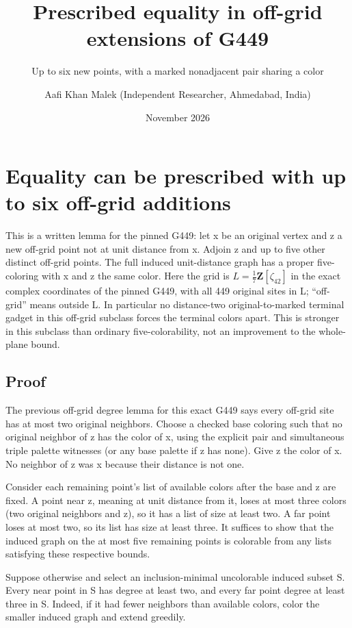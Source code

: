 \documentclass[
  11pt,
]{article}
\title{Prescribed equality in off-grid extensions of G449}
\subtitle{Up to six new points, with a marked nonadjacent pair sharing a
color}
\author{Aafi Khan Malek (Independent Researcher, Ahmedabad, India)}
\date{November 2026}
\begin{document}
\maketitle

\section{Equality can be prescribed with up to six off-grid
additions}\label{equality-can-be-prescribed-with-up-to-six-off-grid-additions}

This is a written lemma for the pinned G449: let x be an original vertex
and z a new off-grid point not at unit distance from x. Adjoin z and up
to five other distinct off-grid points. The full induced unit-distance
graph has a proper five-coloring with x and z the same color. Here the
grid is \(L=\tfrac17\mathbf{Z}[\zeta_{42}]\) in the exact complex
coordinates of the pinned G449, with all 449 original sites in L;
``off-grid'' means outside L. In particular no distance-two
original-to-marked terminal gadget in this off-grid subclass forces the
terminal colors apart. This is stronger in this subclass than ordinary
five-colorability, not an improvement to the whole-plane bound.

\subsection{Proof}\label{proof}

The previous off-grid degree lemma for this exact G449 says every
off-grid site has at most two original neighbors. Choose a checked base
coloring such that no original neighbor of z has the color of x, using
the explicit pair and simultaneous triple palette witnesses (or any base
palette if z has none). Give z the color of x. No neighbor of z was x
because their distance is not one.

Consider each remaining point's list of available colors after the base
and z are fixed. A point near z, meaning at unit distance from it, loses
at most three colors (two original neighbors and z), so it has a list of
size at least two. A far point loses at most two, so its list has size
at least three. It suffices to show that the induced graph on the at
most five remaining points is colorable from any lists satisfying these
respective bounds.

Suppose otherwise and select an inclusion-minimal uncolorable induced
subset S. Every near point in S has degree at least two, and every far
point degree at least three in S. Indeed, if it had fewer neighbors than
available colors, color the smaller induced graph and extend greedily.
\end{document}
